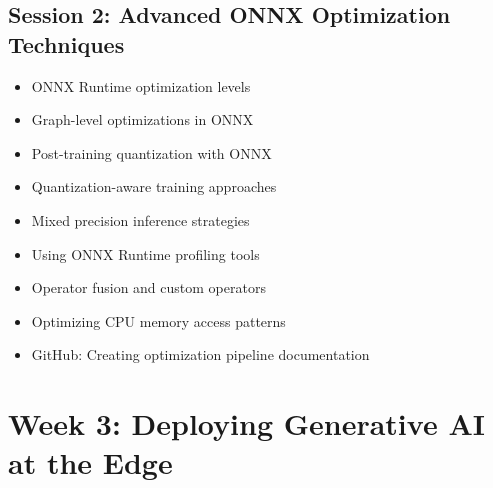 \documentclass[11pt]{article}
\begin{document}
	\subsection{Session 2: Advanced ONNX Optimization Techniques}
	\label{subsec:week2-session2}
	\begin{itemize}
		\item ONNX Runtime optimization levels
		\item Graph-level optimizations in ONNX
		\item Post-training quantization with ONNX
		\item Quantization-aware training approaches
		\item Mixed precision inference strategies
		\item Using ONNX Runtime profiling tools
		\item Operator fusion and custom operators
		\item Optimizing CPU memory access patterns
		\item GitHub: Creating optimization pipeline documentation
	\end{itemize}
	
	\begin{center}
	\end{center}
	
	\section{Week 3: Deploying Generative AI at the Edge}
	\label{sec:week3}
	
\end{document}
